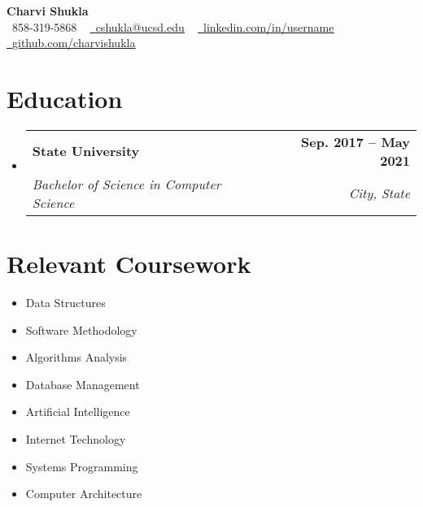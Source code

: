 \documentclass[letterpaper,11pt]{article}
\makeatletter
\newcommand{\resumeSubheading}[4]{
  \vspace{-2pt}\item
    \begin{tabular*}{1.0\textwidth}[t]{l@{\extracolsep{\fill}}r}
      \textbf{#1} & \textbf{\small #2} \\
      \textit{\small#3} & \textit{\small #4} \\
    \end{tabular*}\vspace{-7pt}
}
\newcommand{\resumeSubHeadingListStart}{\begin{itemize}[leftmargin=0.0in, label={}]}
\newcommand{\resumeSubHeadingListEnd}{\end{itemize}}
\makeatother
\begin{document}

\begin{center}
    {\huge \textbf{Charvi Shukla}} \\ \vspace{1pt}
    \small \raisebox{-0.1\height}\faPhone\ 858-319-5868 ~ \href{mailto:cshukla@ucsd.edu}{\raisebox{-0.2\height}\faEnvelope\  \underline{cshukla@ucsd.edu}} ~ 
    \href{https://linkedin.com/in//}{\raisebox{-0.2\height}\faLinkedin\ \underline{linkedin.com/in/username}}  ~
    \href{https://github.com/}{\raisebox{-0.2\height}\faGithub\ \underline{github.com/charvishukla}}
    \vspace{-8pt}
\end{center}


\section{Education}
  \resumeSubHeadingListStart
    \resumeSubheading
      {State University}{Sep. 2017 -- May 2021}
      {Bachelor of Science in Computer Science}{City, State}
  \resumeSubHeadingListEnd

\section{Relevant Coursework}
        \begin{multicols}{4}
            \begin{itemize}[itemsep=-5pt, parsep=3pt]
                \item\small Data Structures
                \item Software Methodology
                \item Algorithms Analysis
                \item Database Management
                \item Artificial Intelligence
                \item Internet Technology
                \item Systems Programming
                \item Computer Architecture
            \end{itemize}
        \end{multicols}
        \vspace*{2.0\multicolsep}
\end{document}
